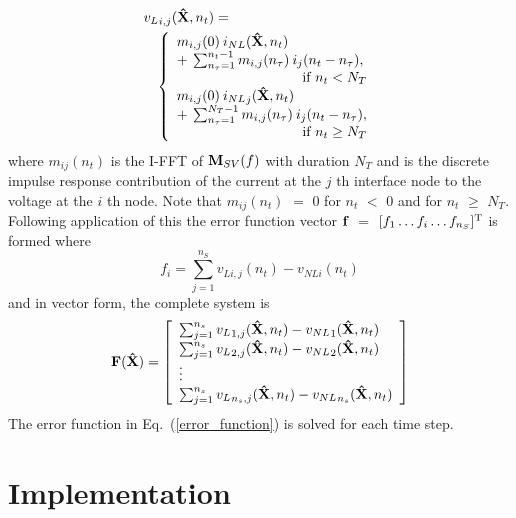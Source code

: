 \begin{eqnarray}
\lefteqn{{v_L}_{i,j}({\bf \hat{X}},n_t) =} \nonumber \\
 & &	\left\{ \begin{array}{l}
	   {m_{i,j}(0) \: i_{NL}({\bf \hat{X}},n_t)} \\
           + \: \sum_{n_{\tau}=1}^{n_t - 1} m_{i,j}(n_{\tau}) \:
                    i_j(n_t - n_{\tau}), \\
	\multicolumn{1}{r}{\mbox{if $n_t < N_T$}} \\
	   {m_{i,j}(0) \: {i_{NL}}_j({\bf \hat{X}},n_t)} \\
           + \: \sum_{n_{\tau}=1}^{N_T-1} m_{i,j}(n_{\tau}) \:
                    i_j(n_t - n_{\tau}), \\
	\multicolumn{1}{r}{\mbox{if $n_t \ge N_T$}}
	\end{array} \right. \label{eq.conv} 
\end{eqnarray}
%
where $m_{ij}(n_t)$ is the I-FFT of ${\bf M}_{SV}(f)$ with duration
$N_T$ and is the discrete impulse response contribution of the current
at the $j$ th interface node to the voltage at the $i$ th node.  Note
that $m_{ij}(n_t)$ $=$ $0$ for $n_t$ $<$ $0$ and for $n_t$ $\ge$
$N_T$. Following application of this the error function vector ${\bf
f}$ $=$ $[f_1 \dots f_i \dots f_{n_S}]^{\mbox{\scriptsize T}}$ is
formed where
\begin{equation}
  f_i = \sum_{j=1}^{n_S} v_{Li,j}(n_t) - v_{NLi}(n_t)
\label{eq:error}
\end{equation}
%
and in vector form, the complete system is
%
\begin{eqnarray}
{\bf F}({\bf \hat{X}}) = 
	  \left[ \begin{array}{l} 
	  \sum_{j=1}^{n_s} {v_L}_{1,j}({\bf \hat{X}},n_t) - 
				  {v_{NL}}_1({\bf \hat{X}},n_t)  \\
	  \sum_{j=1}^{n_s} {v_L}_{2,j}({\bf \hat{X}},n_t) - 
				  {v_{NL}}_2({\bf \hat{X}},n_t) \\ 
	  \vdots\\
	  \sum_{j=1}^{n_s} {v_L}_{n_s,j}({\bf \hat{X}},n_t) - 
				  {v_{NL}}_{n_s}({\bf \hat{X}},n_t) 
	  \end{array} \right] \label{error_function}
\end{eqnarray}
%
The error function in Eq.~(\ref{error_function}) is solved for
each time step.


\section{Implementation}

